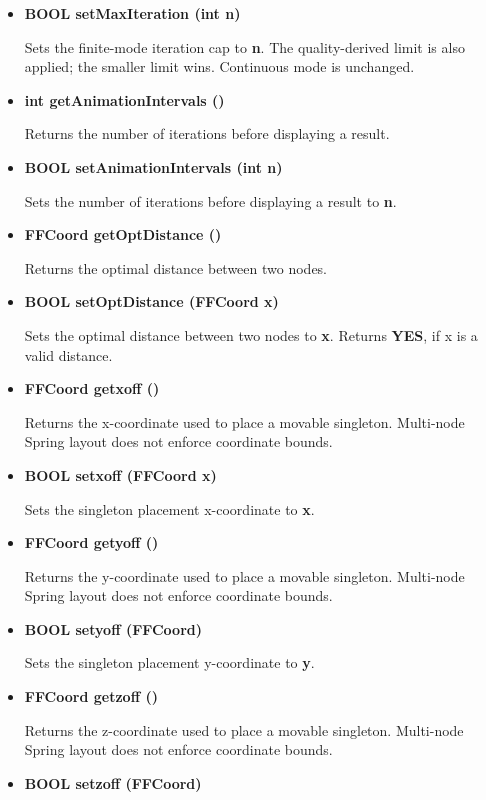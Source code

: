 \begin{itemize}
\item{\bf  BOOL    setMaxIteration (int n)}

Sets the finite-mode iteration cap to {\bf n}. The quality-derived
limit is also applied; the smaller limit wins. Continuous mode is unchanged.

\item{\bf  int     getAnimationIntervals ()}

Returns the number of iterations before displaying a result.

\item{\bf  BOOL    setAnimationIntervals (int n)}

Sets the number of iterations before displaying a result to {\bf n}.

\item{\bf  FFCoord getOptDistance ()}

Returns the optimal distance between two nodes.

\item{\bf  BOOL    setOptDistance (FFCoord x)}
  
  Sets the optimal distance between two nodes to {\bf x}. Returns
  {\bf YES}, if x is a valid distance.

\item{\bf  FFCoord getxoff ()}

  Returns the x-coordinate used to place a movable singleton.
  Multi-node Spring layout does not enforce coordinate bounds.

\item{\bf  BOOL    setxoff (FFCoord x)}
  
  Sets the singleton placement x-coordinate to {\bf x}.

\item{\bf  FFCoord getyoff ()}

  Returns the y-coordinate used to place a movable singleton.
  Multi-node Spring layout does not enforce coordinate bounds.

\item{\bf  BOOL    setyoff (FFCoord)}

  Sets the singleton placement y-coordinate to {\bf y}.

\item{\bf  FFCoord getzoff ()}

  Returns the z-coordinate used to place a movable singleton.
  Multi-node Spring layout does not enforce coordinate bounds.

\item{\bf  BOOL    setzoff (FFCoord)}


\end{itemize}
